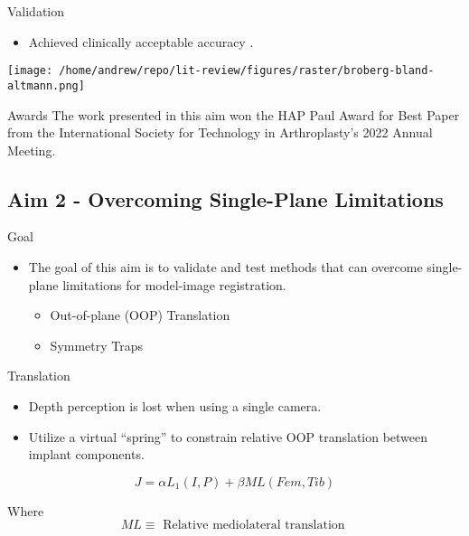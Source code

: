 \documentclass[presentation, aspectratio=1610]{beamer}
\begin{document}
\begin{frame}[label={sec:org5885b5d}]{Validation}
\begin{itemize}
\item Achieved clinically acceptable accuracy \autocites{brobergValidationMachineLearning2023}[][]{jensenJointTrackMachine2022}.
\end{itemize}
\begin{center}
\texttt{[image: /home/andrew/repo/lit-review/figures/raster/broberg-bland-altmann.png]}
\end{center}
\end{frame}
\begin{frame}[label={sec:org0a62a86}]{Awards}
The work presented in this aim won the HAP Paul Award for Best Paper from the International Society for Technology in Arthroplasty's 2022 Annual Meeting.
\end{frame}

\subsection{Aim 2 - Overcoming Single-Plane Limitations}
\label{sec:org9d3ae23}
\begin{frame}[label={sec:orgf7e4769}]{Goal}
\begin{itemize}
\item The goal of this aim is to validate and test methods that can overcome single-plane limitations for model-image registration.
\begin{itemize}
\item Out-of-plane (OOP) Translation
\item Symmetry Traps
\end{itemize}
\end{itemize}
\end{frame}

\begin{frame}[label={sec:org1b5be3e}]{Translation}
\begin{itemize}
\item Depth perception is lost when using a single camera.
\item Utilize a virtual ``spring'' to constrain relative OOP translation between implant components.
\end{itemize}

\begin{equation*}
  J = \alpha L_{1}(I,P) + \beta ML(Fem,Tib)
\end{equation*}

Where
\begin{equation*}
  ML \equiv \text{ Relative mediolateral translation }
\end{equation*}
\end{frame}
\end{document}
